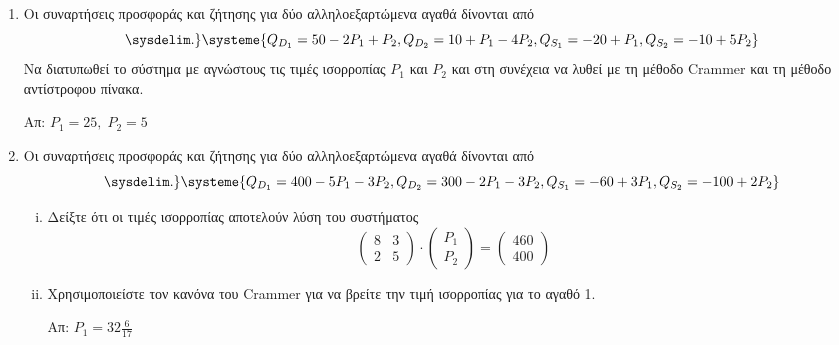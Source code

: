 


\pagestyle{vangelis}





\begin{center}
  \textcolor{Col1}{}
\end{center}

\vspace{\baselineskip}

\begin{enumerate}
  \item Οι συναρτήσεις προσφοράς και ζήτησης για δύο αλληλοεξαρτώμενα αγαθά δίνονται από 
    \[
    \sysdelim.\}
    \systeme{
      Q_{D_1} = 50-2P_{1} + P_{2}, 
      Q_{D_2} = 10 + P_{1} - 4P_{2},
      Q_{S_1} = -20 + P_{1},
      Q_{S_2} = -10+5P_{2}
    }
  \] 
  Να διατυπωθεί το σύστημα με αγνώστους τις τιμές ισορροπίας $ P_{1} $ 
  και $ P_{2} $ και στη συνέχεια να λυθεί με τη μέθοδο \textlatin{Crammer} και τη 
  μέθοδο αντίστροφου πίνακα.

  \hfill Απ: $ {P_{1}=25, \; P_{2}=5} $


\item Οι συναρτήσεις προσφοράς και ζήτησης για δύο αλληλοεξαρτώμενα αγαθά δίνονται από 
  \[
  \sysdelim.\}
  \systeme{
    Q_{D_1} = 400-5P_{1} - 3P_{2}, 
    Q_{D_2} = 300 - 2P_{1} - 3P_{2},
    Q_{S_1} = -60 + 3P_{1},
    Q_{S_2} = -100+2P_{2}
  }
\]
\begin{enumerate}[i)]
  \item Δείξτε ότι οι τιμές ισορροπίας αποτελούν λύση του συστήματος
    \[
      \begin{pmatrix}
        8 & 3 \\
        2 & 5
      \end{pmatrix}\cdot 
      \begin{pmatrix}
        P_{1}\\
        P_{2}
      \end{pmatrix}= 
      \begin{pmatrix}
        460 \\
        400
      \end{pmatrix}
    \] 
  \item Χρησιμοποιείστε τον κανόνα του \textlatin{Crammer} για να βρείτε την 
    τιμή ισορροπίας για το αγαθό 1.

    \hfill Απ: $ P_{1}=32 \frac{6}{17} $ 
\end{enumerate}



\end{enumerate}
